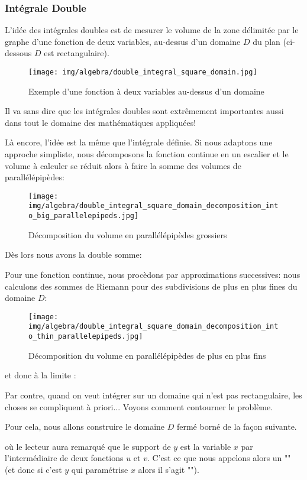 	\subsubsection{Intégrale Double}\label{double integral}
	L'idée des intégrales doubles est de mesurer le volume de la zone délimitée par le graphe d'une fonction de deux variables, au-dessus d'un domaine $D$ du plan (ci-dessous $D$ est rectangulaire).
	\begin{figure}[H]
		\centering
		\texttt{[image: img/algebra/double\_integral\_square\_domain.jpg]}
		\caption{Exemple d'une fonction à deux variables au-dessus d'un domaine}
	\end{figure}
	Il va sans dire que les intégrales doubles sont extrêmement importantes aussi dans tout le domaine des mathématiques appliquées!
	
	Là encore, l'idée est la même que l'intégrale définie. Si nous adaptons une approche simpliste, nous décomposons la fonction continue en un escalier et le volume à calculer se réduit alors à faire la somme des volumes de parallélépipèdes:
	\begin{figure}[H]
		\centering
		\texttt{[image: img/algebra/double\_integral\_square\_domain\_decomposition\_into\_big\_parallelepipeds.jpg]}
		\caption{Décomposition du volume en parallélépipèdes grossiers}
	\end{figure}
	Dès lors nous avons la double somme:
	
	Pour une fonction continue, nous procèdons par approximations successives: nous calculons des sommes de Riemann pour des subdivisions de plus en plus fines du domaine $D$:
	\begin{figure}[H]
		\centering
		\texttt{[image: img/algebra/double\_integral\_square\_domain\_decomposition\_into\_thin\_parallelepipeds.jpg]}
		\caption{Décomposition du volume en parallélépipèdes de plus en plus fins}
	\end{figure}
	et donc à la limite : 
	
	Par contre, quand on veut intégrer sur un domaine qui n'est pas rectangulaire, les choses se compliquent à priori... Voyons comment contourner le problème.
	
	Pour cela, nous allons construire le domaine $D$ fermé borné de la façon suivante.
	
	où le lecteur aura remarqué que le support de $y$ est la variable $x$ par l'intermédiaire de deux fonctions $u$ et $v$. C'est ce que nous appelons alors un "" (et donc si c'est $y$ qui paramétrise $x$ alors il s'agit "").

